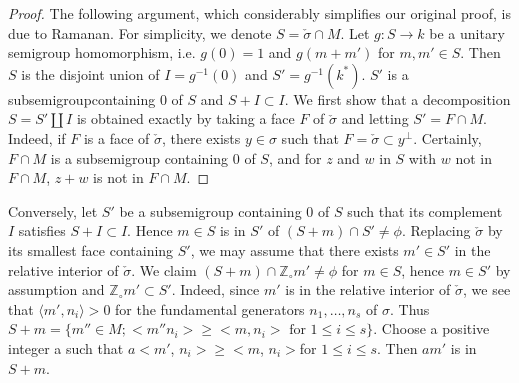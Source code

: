 \begin{proof}
The following argument, which considerably simplifies our original
proof, is due to Ramanan. For simplicity, we denote $ S=
\check{\sigma} \cap M$. Let $g : S \to k $ be a unitary semigroup
homomorphism, i.e. $g(0)=1$ and $g(m+m')$ for $m, m' \in S$. Then $S$
is the disjoint union of $I = g^{-1}(0)$ and $S' = g^{-1}(k^*)$. $S'$
is a subsemigroup\pageoriginale  containing 0 of $S$ and $S + I
\subset I$. We first show that a decomposition $S = S' \coprod I$ is
obtained exactly by 
taking a face $F$ of $\check{\sigma}$ and letting $S' = F \cap
M$. Indeed, if $F$ is a face of $\check{\sigma}$, there exists $y \in
\sigma$ such that $F = \check{\sigma}\subset y^\perp$. Certainly, $F
\cap M$ is a subsemigroup containing 0 of $S$, and for $z$ and $w$ in
$S$ with $w$ not in $F \cap M$, $z+w$ is not in $F\cap M$.   
\end{proof}

	Conversely, let $S'$ be a subsemigroup containing 0 of $S$
        such that its complement $I$ satisfies $S + I \subset
        I$. Hence $m \in S$ is in $S'$ of $(S+m) \cap S' \neq
        \phi$. Replacing $\check{\sigma}$ by its smallest face
        containing $S'$, we may assume that there exists $m' \in S'$
        in the relative interior of $\check{\sigma}$. We claim
        $(S+m)\cap \mathbb{Z}_\circ m' \neq \phi$ for $m \in S$, hence $m
        \in S'$ by assumption and $\mathbb{Z}_\circ m' \subset
        S'$. Indeed, since $m'$ is in the
        relative interior of $\check{\sigma}$, we see that $ \langle
        m', n_i \rangle > 0$ for the fundamental generators $n_1,
        \ldots , n_s$ of $\sigma$. Thus $S+m= \{ m'' \in M ; < m'' n_i>
        \geq < m, n_i> \text{ for } 1 \leq i \leq s \}$. Choose a
        positive integer a such that $a<m'$, $n_i> \geq <m$,
        $n_i>$for $1\leq i \leq s$. Then $am'$ is in $S+m$.  
 	 
